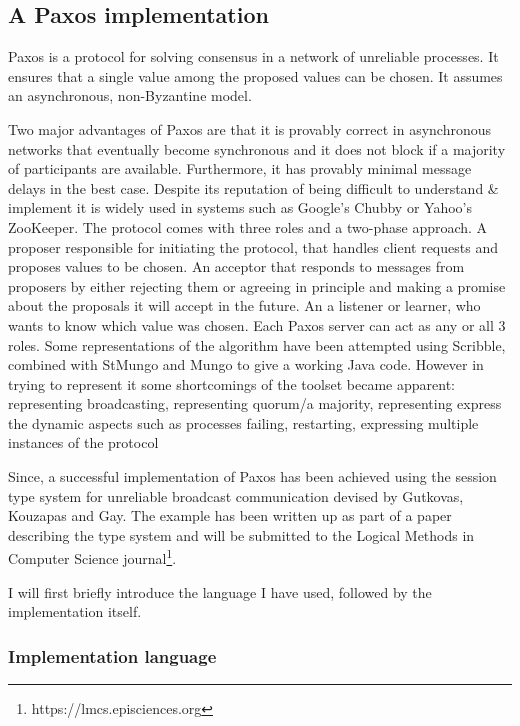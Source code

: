 \subsection{A Paxos implementation}

Paxos is a protocol for solving consensus in a network of unreliable processes. It ensures that a single value among the proposed values can be chosen. It assumes an asynchronous, non-Byzantine model.\cite{lamport1998part}

Two major advantages of Paxos are that it is provably correct in asynchronous networks that eventually become synchronous and it does not block if a majority of participants are available. Furthermore, it has provably minimal message delays in the best case. Despite its reputation of being difficult to understand \& implement it is widely used in systems such as Google's Chubby\cite{chandra2007paxos} or Yahoo's ZooKeeper. The protocol comes with three roles and a two-phase approach. A proposer responsible for initiating the protocol, that handles client requests and
proposes values to be chosen. An acceptor that responds to messages from proposers by either rejecting them or agreeing in principle and making a promise about the proposals it will accept in the future. An a listener or learner, who wants to know which value was chosen. Each Paxos server can act as any or all 3 roles.\cite{lamport2001paxos} Some representations of the algorithm have been attempted using Scribble, combined with StMungo and Mungo to give a working Java code. However in trying to represent it some shortcomings of the toolset became apparent: representing broadcasting, representing quorum/a majority, representing express the dynamic aspects such as processes failing, restarting, expressing multiple instances of the protocol

Since, a successful implementation of Paxos has been achieved using the session type system for unreliable broadcast communication devised by Gutkovas, Kouzapas and Gay. The example has been written up as part of a paper describing the type system and will be submitted to the Logical Methods in Computer Science journal\footnote{https://lmcs.episciences.org}.

I will first briefly introduce the language I have used, followed by the implementation itself.
\subsubsection{Implementation language}

